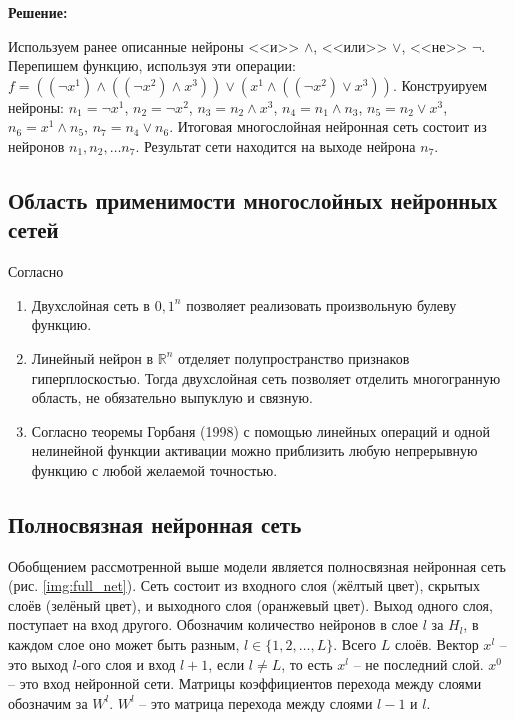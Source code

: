 \textbf{Решение:}

Используем ранее описанные нейроны <<и>> $\wedge$, <<или>> $\vee$, <<не>> $\neg$. Перепишем функцию, используя эти операции: $f = ((\neg x^1) \wedge ((\neg x^2) \wedge x^3)) \vee (x^1 \wedge ((\neg x^2) \vee x^3))$. Конструируем нейроны: $n_1 = \neg x^1$, $n_2 = \neg x^2$, $n_3 = n_2 \wedge x^3$, $n_4 = n_1 \wedge n_3$, $n_5 = n_2 \vee x^3$, $n_6 = x^1 \wedge n_5$, $n_7 = n_4 \vee n_6$. Итоговая многослойная нейронная сеть состоит из нейронов $n_1, n_2, \dots n_7$. Результат сети находится на выходе нейрона $n_7$.

\newpage

\subsection{Область применимости многослойных нейронных сетей}

Согласно \cite{VorontsovSite}
\begin{enumerate}
	\item Двухслойная сеть в ${0, 1}^n$ позволяет реализовать произвольную булеву функцию.
	
	\item Линейный нейрон в $\mathbb{R}^n$ отделяет полупространство признаков гиперплоскостью. Тогда двухслойная сеть позволяет отделить многогранную область, не обязательно выпуклую и связную.
	
	\item Согласно теоремы Горбаня (1998) с помощью линейных операций и одной нелинейной функции активации можно приблизить любую непрерывную функцию с любой желаемой точностью.
\end{enumerate}

\subsection{Полносвязная нейронная сеть}

Обобщением рассмотренной выше модели является полносвязная нейронная сеть (рис. \ref{img:full_net}). Сеть состоит из входного слоя (жёлтый цвет), скрытых слоёв (зелёный цвет), и выходного слоя (оранжевый цвет). Выход одного слоя, поступает на вход другого. Обозначим количество нейронов в слое $l$ за $H_l$, в каждом слое оно может быть разным, $l \in \{1, 2, \dots, L\}$. Всего $L$ слоёв. Вектор $x^l$ -- это выход $l$-ого слоя и вход $l+1$, если $l \neq L$, то есть $x^l$ -- не последний слой. $x^0$ -- это вход нейронной сети. Матрицы коэффициентов перехода между слоями обозначим за $W^l$. $W^l$ -- это матрица перехода между слоями $l-1$ и $l$.

